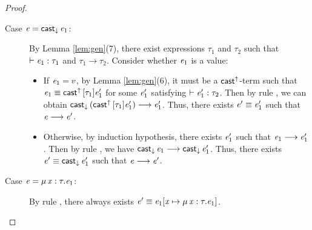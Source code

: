 \begin{proof}
\begin{description}
\begin{itemize}
    		\end{itemize}
		\item[Case $\mathit{e}=\mathsf{cast}_{\downarrow} \, \mathit{e_{{\mathrm{1}}}}$:] By Lemma \ref{lem:gen}(7), there exist expressions $\tau_{{\mathrm{1}}}$ and $\tau_{{\mathrm{2}}}$ such that $\vdash  \mathit{e_{{\mathrm{1}}}}  :  \tau_{{\mathrm{1}}}$ and $\tau_{{\mathrm{1}}}  \longrightarrow  \tau_{{\mathrm{2}}}$. Consider whether $\mathit{e_{{\mathrm{1}}}}$ is a value:
		     \begin{itemize}
    		    \item If $\mathit{e_{{\mathrm{1}}}}=v$, by Lemma \ref{lem:gen}(6), it must be a $ \mathsf{cast}^{\uparrow} $-term such that $\mathit{e_{{\mathrm{1}}}}  \equiv  \mathsf{cast}^{\uparrow} \, [  \tau_{{\mathrm{1}}}  ]  \mathit{e'_{{\mathrm{1}}}}$ for some $\mathit{e'_{{\mathrm{1}}}}$ satisfying $\vdash  \mathit{e'_{{\mathrm{1}}}}  :  \tau_{{\mathrm{2}}}$. Then by rule , we can obtain $\mathsf{cast}_{\downarrow} \, (  \mathsf{cast}^{\uparrow} \, [  \tau_{{\mathrm{1}}}  ]  \mathit{e'_{{\mathrm{1}}}}  )  \longrightarrow  \mathit{e'_{{\mathrm{1}}}}$. Thus, there exists $\mathit{e'}  \equiv  \mathit{e'_{{\mathrm{1}}}}$ such that $\mathit{e}  \longrightarrow  \mathit{e'}$.
    		    \item Otherwise, by induction hypothesis, there exists $\mathit{e'_{{\mathrm{1}}}}$ such that $\mathit{e_{{\mathrm{1}}}}  \longrightarrow  \mathit{e'_{{\mathrm{1}}}}$. Then by rule , we have $\mathsf{cast}_{\downarrow} \, \mathit{e_{{\mathrm{1}}}}  \longrightarrow  \mathsf{cast}_{\downarrow} \, \mathit{e'_{{\mathrm{1}}}}$. Thus, there exists $\mathit{e'}  \equiv  \mathsf{cast}_{\downarrow} \, \mathit{e'_{{\mathrm{1}}}}$ such that $\mathit{e}  \longrightarrow  \mathit{e'}$.
    		\end{itemize}
		\item[Case $\mathit{e}=\mu \, \mathit{x}  :  \tau  .  \mathit{e_{{\mathrm{1}}}}$:] By rule , there always exists $\mathit{e'}  \equiv  \mathit{e_{{\mathrm{1}}}}  [  \mathit{x}  \mapsto  \mu \, \mathit{x}  :  \tau  .  \mathit{e_{{\mathrm{1}}}}  ]$.
    \end{description}
\end{proof}

